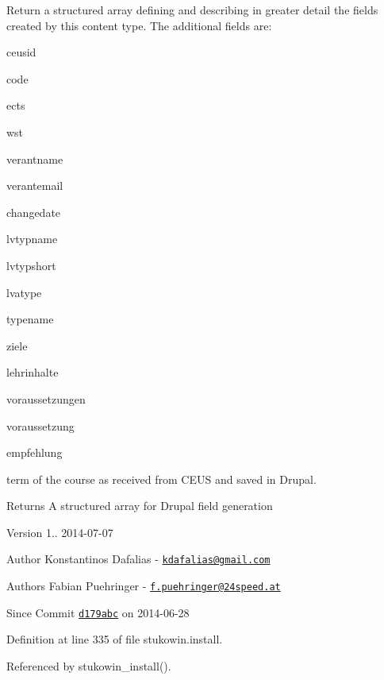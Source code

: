 Return a structured array defining and describing in greater detail the fields created by this content type. The additional fields are\+:
\begin{DoxyItemize}
\item ceusid
\item code
\item ects
\item wst
\item verantname
\item verantemail
\item changedate
\item lvtypname
\item lvtypshort
\item lvatype
\item typename
\item ziele
\item lehrinhalte
\item voraussetzungen
\item voraussetzung
\item empfehlung
\item term of the course as received from C\+E\+U\+S and saved in Drupal. \begin{DoxyReturn}{Returns}
A structured array for Drupal field generation
\end{DoxyReturn}
\begin{DoxyVersion}{Version}
1.. 2014-\/07-\/07 
\end{DoxyVersion}
\begin{DoxyAuthor}{Author}
Konstantinos Dafalias -\/ \href{mailto:kdafalias@gmail.com}{\tt kdafalias@gmail.\+com} 
\end{DoxyAuthor}
\begin{DoxyAuthor}{Authors}
Fabian Puehringer -\/ \href{mailto:f.puehringer@24speed.at}{\tt f.\+puehringer@24speed.\+at} 
\end{DoxyAuthor}
\begin{DoxySince}{Since}
Commit \href{http://github.com/TheJake123/DrupalModul/commit/d179abcc5e05743086cd67cf1ce30b08923a7183}{\tt d179abc} on 2014-\/06-\/28 
\end{DoxySince}

\end{DoxyItemize}

Definition at line 335 of file stukowin.\+install.



Referenced by stukowin\+\_\+install().



